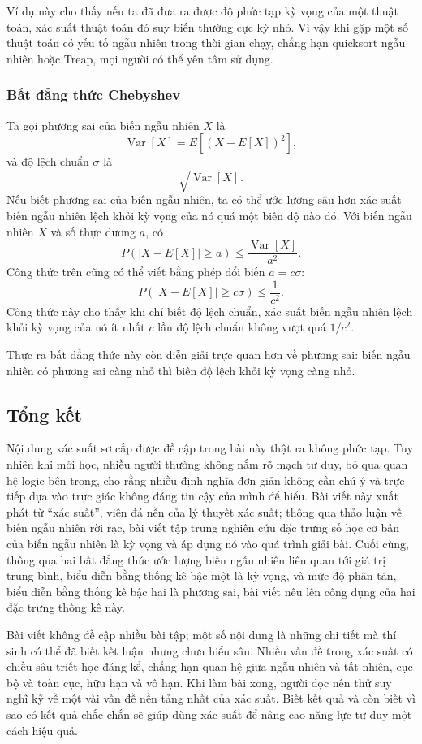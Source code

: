 \documentclass[11pt]{article}
\begin{document}
Ví dụ này cho thấy nếu ta đã đưa ra được độ phức tạp kỳ vọng của một thuật
toán, xác suất thuật toán đó suy biến thường cực kỳ nhỏ. Vì vậy khi gặp một
số thuật toán có yếu tố ngẫu nhiên trong thời gian chạy, chẳng hạn quicksort
ngẫu nhiên hoặc Treap, mọi người có thể yên tâm sử dụng.

\subsubsection{Bất đẳng thức Chebyshev}

Ta gọi phương sai của biến ngẫu nhiên \(X\) là
\[
  \operatorname{Var}[X]=E[(X-E[X])^2],
\]
và độ lệch chuẩn \(\sigma\) là
\[
  \sqrt{\operatorname{Var}[X]}.
\]
Nếu biết phương sai của biến ngẫu nhiên, ta có thể ước lượng sâu hơn xác suất
biến ngẫu nhiên lệch khỏi kỳ vọng của nó quá một biên độ nào đó. Với biến
ngẫu nhiên \(X\) và số thực dương \(a\), có
\[
  P(|X-E[X]|\ge a)\le \frac{\operatorname{Var}[X]}{a^2}.
\]
Công thức trên cũng có thể viết bằng phép đổi biến \(a=c\sigma\):
\[
  P(|X-E[X]|\ge c\sigma)\le \frac1{c^2}.
\]
Công thức này cho thấy khi chỉ biết độ lệch chuẩn, xác suất biến ngẫu nhiên
lệch khỏi kỳ vọng của nó ít nhất \(c\) lần độ lệch chuẩn không vượt quá
\(1/c^2\).

Thực ra bất đẳng thức này còn diễn giải trực quan hơn về phương sai: biến
ngẫu nhiên có phương sai càng nhỏ thì biên độ lệch khỏi kỳ vọng càng nhỏ.

\subsection{Tổng kết}

Nội dung xác suất sơ cấp được đề cập trong bài này thật ra không phức tạp.
Tuy nhiên khi mới học, nhiều người thường không nắm rõ mạch tư duy, bỏ qua
quan hệ logic bên trong, cho rằng nhiều định nghĩa đơn giản không cần chú ý
và trực tiếp dựa vào trực giác không đáng tin cậy của mình để hiểu. Bài viết
này xuất phát từ ``xác suất'', viên đá nền của lý thuyết xác suất; thông qua
thảo luận về biến ngẫu nhiên rời rạc, bài viết tập trung nghiên cứu đặc
trưng số học cơ bản của biến ngẫu nhiên là kỳ vọng và áp dụng nó vào quá
trình giải bài. Cuối cùng, thông qua hai bất đẳng thức ước lượng biến ngẫu
nhiên liên quan tới giá trị trung bình, biểu diễn bằng thống kê bậc một là
kỳ vọng, và mức độ phân tán, biểu diễn bằng thống kê bậc hai là phương sai,
bài viết nêu lên công dụng của hai đặc trưng thống kê này.

Bài viết không đề cập nhiều bài tập; một số nội dung là những chi tiết mà
thí sinh có thể đã biết kết luận nhưng chưa hiểu sâu. Nhiều vấn đề trong xác
suất có chiều sâu triết học đáng kể, chẳng hạn quan hệ giữa ngẫu nhiên và
tất nhiên, cục bộ và toàn cục, hữu hạn và vô hạn. Khi làm bài xong, người
đọc nên thử suy nghĩ kỹ về một vài vấn đề nền tảng nhất của xác suất. Biết
kết quả và còn biết vì sao có kết quả chắc chắn sẽ giúp dùng xác suất để
nâng cao năng lực tư duy một cách hiệu quả.
\end{document}
